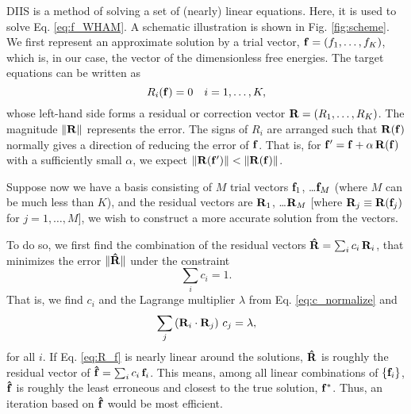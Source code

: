 \documentclass[reprint,superscriptaddress]{revtex4-1}
\begin{document}
DIIS is a method of solving a set of
(nearly) linear equations\cite{
pulay1980, *pulay1982, *hamilton1986,
kovalenko1999, howard2011}.
%
Here, it is used
to solve Eq. \eqref{eq:f_WHAM}.
%
A schematic illustration
is shown in Fig. \ref{fig:scheme}.
%
We first represent an approximate solution
by a trial vector,
$\mathbf{f} = (f_1, \dots, f_K)$,
which is, in our case, the vector of
the dimensionless free energies.
%
The target equations can be written as
%
\begin{equation}
  R_i(\mathbf{f}) = 0  \quad i = 1, \ldots, K,
  \label{eq:R_f}
\end{equation}
%
whose left-hand side forms
a residual or correction vector
$\mathbf{R} = (R_1, \dots, R_K)$.
%
The magnitude
$\| \mathbf{R} \|$
represents the error.
%
The signs of $R_i$ are arranged such that
$\mathbf{R}(\mathbf{f})$
normally gives a direction
of reducing the error of $\mathbf{f}$.
%
That is,
for $\mathbf{f}' = \mathbf{f} + \alpha \, \mathbf{R}(\mathbf{f})$
with a sufficiently small $\alpha$,
we expect
%
$\| \mathbf{R}(\mathbf{f}') \| < \| \mathbf{R}(\mathbf{f}) \|$.



Suppose now we have a basis consisting of $M$ trial vectors
$\mathbf{f}_1$, \dots $\mathbf{f}_M$
(where $M$ can be much less than $K$),
%
and the residual vectors are
$\mathbf{R}_1$, \dots $\mathbf{R}_M$
[where $\mathbf{R}_j \equiv \mathbf{R}(\mathbf{f}_j)$
for $j = 1, \dots, M$],
%
we wish to construct a more accurate solution
from the vectors.



To do so, we first find the combination of the residual vectors
$\mathbf{\hat R} = \sum_i c_i \, \mathbf{R}_i$,
that minimizes the error
$\| \mathbf{\hat R} \|$
under the constraint
\begin{equation}
  \sum_i c_i = 1.
  \label{eq:c_normalize}
\end{equation}
%
That is,
we find $c_i$ and the Lagrange multiplier $\lambda$
from Eq. \eqref{eq:c_normalize} and
\begin{equation*}
  \sum_j \left( \mathbf{R}_i \cdot \mathbf{R}_j \right) \, c_j = \lambda,
\end{equation*}
for all $i$.
%
If Eq. \eqref{eq:R_f} is nearly linear
around the solutions,
%
$\mathbf{\hat R}$
is roughly the residual vector of
$\mathbf{\hat f} = \sum_i c_i \, \mathbf{f}_i$.
%
This means,
among all linear combinations of
$\{ \mathbf{f}_i \}$,
$\mathbf{\hat f}$
is roughly the least erroneous
and closest to the true solution,
$\mathbf{f}^*$.
%
Thus,
an iteration based on
$\mathbf{\hat f}$
would be most efficient.
\end{document}
